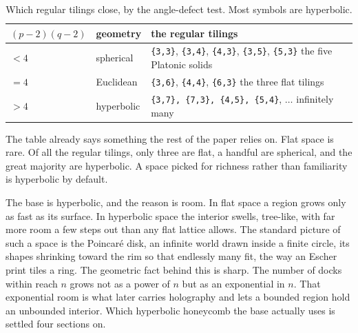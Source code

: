 \begin{table}[ht]
\centering
\begin{tabular}{@{}llp{}@{}}
\toprule
$(p-2)(q-2)$ & geometry & the regular tilings \\
\midrule
$< 4$ & spherical & \texttt{\{3,3\}}, \texttt{\{3,4\}}, \texttt{\{4,3\}}, \texttt{\{3,5\}}, \texttt{\{5,3\}} \newline the five Platonic solids \\
\addlinespace
$= 4$ & Euclidean & \texttt{\{3,6\}}, \texttt{\{4,4\}}, \texttt{\{6,3\}} \newline the three flat tilings \\
\addlinespace
$> 4$ & hyperbolic & \texttt{\{3,7\}, \{7,3\}, \{4,5\}, \{5,4\}}, $\dots$ \newline infinitely many \\
\bottomrule
\end{tabular}
\caption{Which regular tilings close, by the angle-defect test. Most symbols are hyperbolic.}
\label{tab:tilings}
\end{table}

The table already says something the rest of the paper relies on. Flat space is rare. Of all the regular tilings, only three are flat, a handful are spherical, and the great majority are hyperbolic. A space picked for richness rather than familiarity is hyperbolic by default.

The base is hyperbolic, and the reason is room. In flat space a region grows only as fast as its surface. In hyperbolic space the interior swells, tree-like, with far more room a few steps out than any flat lattice allows. The standard picture of such a space is the Poincar\'e disk, an infinite world drawn inside a finite circle, its shapes shrinking toward the rim so that endlessly many fit, the way an Escher print tiles a ring. The geometric fact behind this is sharp. The number of docks within reach $n$ grows not as a power of $n$ but as an exponential in $n$. That exponential room is what later carries holography and lets a bounded region hold an unbounded interior. Which hyperbolic honeycomb the base actually uses is settled four sections on.
